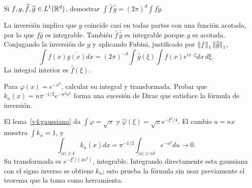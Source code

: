 \begin{ejercicio}\label{ej:v4-l11-3}
Si $f,g,\widehat f,\widehat g\in L^1(\mathbb R^d)$, demostrar
$\int\widehat f\,\overline{\widehat g}=(2\pi)^d\int f\overline g$.
\end{ejercicio}
\begin{solucion}
La inversión implica que $g$ coincide casi en todas partes con una función acotada, por lo que $f\overline g$ es integrable. También $\widehat f\,\overline{\widehat g}$ es integrable porque $\widehat g$ es acotada. Conjugando la inversión de $g$ y aplicando Fubini, justificado por $\left\lVert f\right\rVert_1\left\lVert\widehat g\right\rVert_1$,
\[
 \int f(x)\overline{g(x)}dx
 =(2\pi)^{-d}\int\overline{\widehat g(\xi)}\int f(x)e^{ix\cdot\xi}dx\,d\xi.
\]
La integral interior es $\widehat f(\xi)$.
\end{solucion}

\begin{ejercicio}\label{ej:v4-l11-4}
Para $\varphi(x)=e^{-x^2}$, calcular su integral y transformada. Probar que $k_n(x)=n\pi^{-1/2}e^{-n^2x^2}$ forma una sucesión de Dirac que satisface la fórmula de inversión.
\end{ejercicio}
\begin{solucion}
El lema~\ref{v4:gaussiana} da $\int\varphi=\sqrt\pi$ y $\widehat\varphi(\xi)=\sqrt\pi e^{-\xi^2/4}$. El cambio $u=nx$ muestra $\int k_n=1$, y
\[
 \int_{|x|\geq\delta}k_n(x)dx=\pi^{-1/2}\int_{|u|\geq n\delta}e^{-u^2}du\longrightarrow0.
\]
Su transformada es $e^{-\xi^2/(4n^2)}$, integrable. Integrando directamente esta gaussiana con el signo inverso se obtiene $k_n$; esto prueba la fórmula sin usar previamente el teorema que la toma como herramienta.
\end{solucion}

